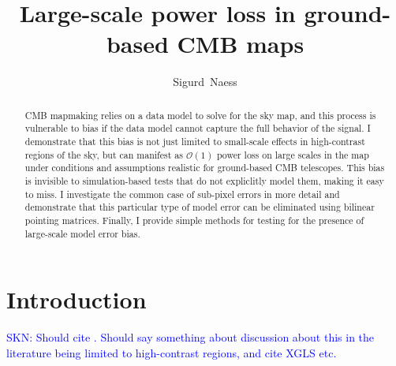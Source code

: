 \documentclass[twocolumn,apj]{aastex63}
\newcommand\skn[1]{\textcolor{blue}{SKN: #1}}
\begin{document}
\title{Large-scale power loss in ground-based CMB maps}

\author[0000-0002-4478-7111]{Sigurd~Naess}

\keywords{}

\begin{abstract}
CMB mapmaking relies on a data model to solve for the sky map, and this
process is vulnerable to bias if the data model cannot capture the full
behavior of the signal. I demonstrate that this bias is not just limited to
small-scale effects in high-contrast regions of the sky, but can manifest
as $\mathcal{O}(1)$ power loss on large scales in the map under conditions
and assumptions realistic for ground-based CMB telescopes. This bias is
invisible to simulation-based tests that do not expliclitly model them,
making it easy to miss. I investigate the common case of sub-pixel errors
in more detail and demonstrate that this particular type of model error can
be eliminated using bilinear pointing matrices. Finally, I provide simple
methods for testing for the presence of large-scale model error bias.
\end{abstract}

\section{Introduction}
\skn{Should cite \citet{model-error}. Should say something about discussion about
this in the literature being limited to high-contrast regions, and cite XGLS
etc.}
\end{document}
